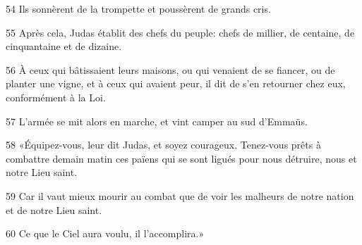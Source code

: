 
54 Ils sonnèrent de la trompette et poussèrent de grands cris.

55 Après cela, Judas établit des chefs du peuple: chefs de millier, de centaine, de cinquantaine et de dizaine.

56 À ceux qui bâtissaient leurs maisons, ou qui venaient de se fiancer, ou de planter une vigne, et à ceux qui avaient peur, il dit de s’en retourner chez eux, conformément à la Loi.

57 L’armée se mit alors en marche, et vint camper au sud d’Emmaüs.

58 «Équipez-vous, leur dit Judas, et soyez courageux. Tenez-vous prêts à combattre demain matin ces païens qui se sont ligués pour nous détruire, nous et notre Lieu saint.

59 Car il vaut mieux mourir au combat que de voir les malheurs de notre nation et de notre Lieu saint.

60 Ce que le Ciel aura voulu, il l’accomplira.»